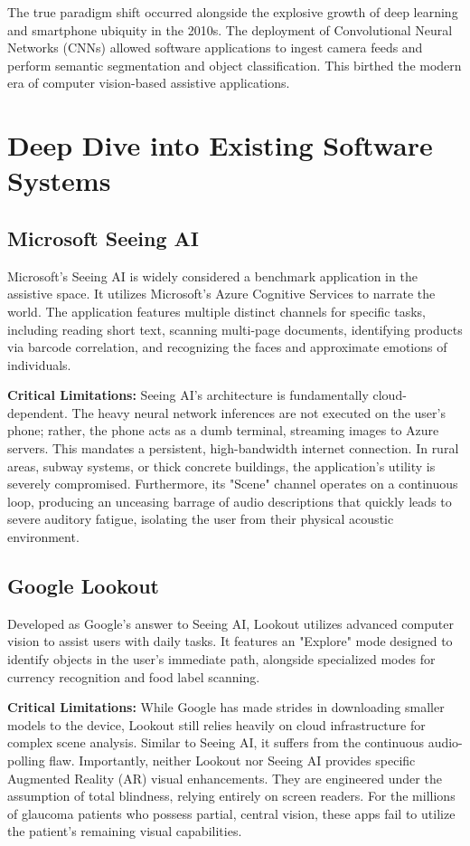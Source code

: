 \documentclass[12pt, a4paper]{report}
\begin{document}
The true paradigm shift occurred alongside the explosive growth of deep learning and smartphone ubiquity in the 2010s. The deployment of Convolutional Neural Networks (CNNs) allowed software applications to ingest camera feeds and perform semantic segmentation and object classification. This birthed the modern era of computer vision-based assistive applications.

\section{Deep Dive into Existing Software Systems}

\subsection{Microsoft Seeing AI}
Microsoft's Seeing AI is widely considered a benchmark application in the assistive space. It utilizes Microsoft's Azure Cognitive Services to narrate the world. The application features multiple distinct channels for specific tasks, including reading short text, scanning multi-page documents, identifying products via barcode correlation, and recognizing the faces and approximate emotions of individuals.

\textbf{Critical Limitations:} Seeing AI's architecture is fundamentally cloud-dependent. The heavy neural network inferences are not executed on the user's phone; rather, the phone acts as a dumb terminal, streaming images to Azure servers. This mandates a persistent, high-bandwidth internet connection. In rural areas, subway systems, or thick concrete buildings, the application's utility is severely compromised. Furthermore, its "Scene" channel operates on a continuous loop, producing an unceasing barrage of audio descriptions that quickly leads to severe auditory fatigue, isolating the user from their physical acoustic environment.

\subsection{Google Lookout}
Developed as Google's answer to Seeing AI, Lookout utilizes advanced computer vision to assist users with daily tasks. It features an "Explore" mode designed to identify objects in the user's immediate path, alongside specialized modes for currency recognition and food label scanning.

\textbf{Critical Limitations:} While Google has made strides in downloading smaller models to the device, Lookout still relies heavily on cloud infrastructure for complex scene analysis. Similar to Seeing AI, it suffers from the continuous audio-polling flaw. Importantly, neither Lookout nor Seeing AI provides specific Augmented Reality (AR) visual enhancements. They are engineered under the assumption of total blindness, relying entirely on screen readers. For the millions of glaucoma patients who possess partial, central vision, these apps fail to utilize the patient's remaining visual capabilities.
\end{document}
